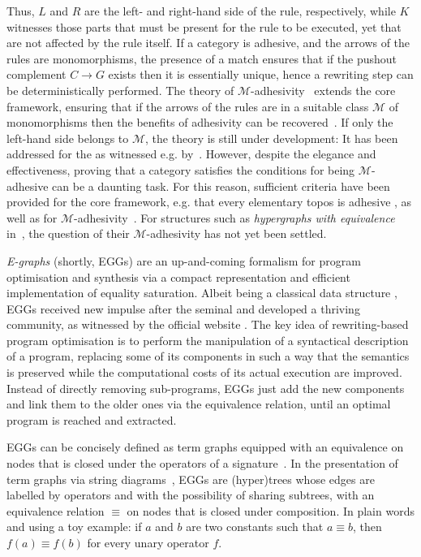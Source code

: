 \documentclass[3p]{elsarticle}
\theoremstyle{remark}
\theoremstyle{definition}
\begin{document}
Thus, $L$ and $R$ are the left- and right-hand side of the rule, respectively, while $K$ witnesses those parts that must 
be present for the rule to be executed, yet that are not affected by the rule itself.
%
If a category is adhesive, and the arrows of the rules are monomorphisms, the presence of a match ensures that
if the pushout complement $C \to G$ exists then it is essentially unique, hence a rewriting step can be deterministically performed.
%
The theory of $\mathcal{M}$-adhesivity~\cite{azzi2019essence,heindel2009category} extends the core framework, ensuring that if the arrows 
of the rules are in a suitable class $\mathcal{M}$ of monomorphisms
then the benefits of adhesivity
can be recovered~\cite{ehrig2012,ehrig2014adhesive}. 
If only the left-hand side belongs to $\mathcal{M}$, the theory is still under development:
It has been addressed for the 
as witnessed e.g.
by~\cite{BaldanC0G24,BehrHK23}.
%
However, despite the elegance and effectiveness,
proving that a category satisfies the conditions 
for being $\mathcal{M}$-adhesive can be a daunting task. For this reason, sufficient criteria have been provided for the core 
framework, e.g. that every elementary topos is adhesive \cite{lack2006toposes}, as well as for %
$\mathcal{M}$-adhesivity~\cite{CastelnovoGM24}.
%
For structures such as \emph{hypergraphs with equivalence} in~\cite{concur2006}, the question 
of their $\mathcal{M}$-adhesivity has not yet been settled.

\emph{E-graphs} (shortly, EGGs) are an up-and-coming formalism for program optimisation and synthesis via a compact 
representation and efficient implementation of equality saturation. Albeit being a classical data structure \cite{DetlefsNS05}, EGGs received 
new impulse after the seminal \cite{WillseyNWFTP21} and
developed a thriving community, as witnessed by the official website \cite{eggs}.
%
The key idea of rewriting-based program optimisation is to perform the manipulation of a syntactical description 
of a program, replacing some of its components in such a way that the semantics is preserved while 
the computational costs of its actual execution are improved. Instead of directly removing sub-programs, EGGs just add the 
new components and link them to the older ones via the equivalence relation, until an optimal program is 
reached and extracted.

EGGs can be concisely defined as term graphs equipped with an equivalence on nodes
that is closed under the operators of a signature~\cite[Section~4.2]{DetlefsNS05}.
In the presentation of term graphs via string diagrams~\cite{CastelnovoGM24}, EGGs are (hyper)trees 
whose edges are labelled by operators and with
the possibility of sharing subtrees, with an equivalence relation $\equiv$ on nodes that 
is closed under composition. In plain words and using a toy example:
if $a$ and $b$ are two constants such that $a \equiv b$, then $f(a) \equiv f(b)$ for every unary operator $f$.
\end{document}
